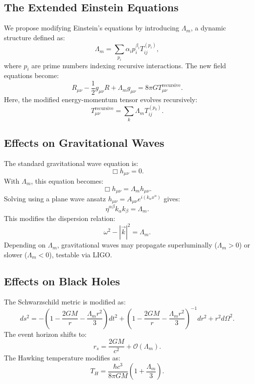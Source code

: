 \documentclass{article}
\theoremstyle{plain}
\begin{document}
\begin{itemize}
\begin{itemize}
\subsection{The Extended Einstein Equations}
We propose modifying Einstein’s equations by introducing $\Lambda_m$, a dynamic structure defined as:
\begin{equation}
    \Lambda_m = \sum_{p_i} \alpha_i p_i^{\beta_i} T_{ij}^{(p_i)},
\end{equation}
where $p_i$ are prime numbers indexing recursive interactions.
The new field equations become:
\begin{equation}
    R_{\mu\nu} - \frac{1}{2} g_{\mu\nu} R + \Lambda_m g_{\mu\nu} = 8\pi G T_{\mu\nu}^{\text{recursive}}.
\end{equation}
Here, the modified energy-momentum tensor evolves recursively:
\begin{equation}
    T_{\mu\nu}^{\text{recursive}} = \sum_{k} \Lambda_m T_{ij}^{(p_k)}.
\end{equation}

\subsection{Effects on Gravitational Waves}
The standard gravitational wave equation is:
\begin{equation}
    \Box h_{\mu\nu} = 0.
\end{equation}
With $\Lambda_m$, this equation becomes:
\begin{equation}
    \Box h_{\mu\nu} = \Lambda_m h_{\mu\nu}.
\end{equation}
Solving using a plane wave ansatz $h_{\mu\nu} = A_{\mu\nu} e^{i (k_\alpha x^\alpha)}$ gives:
\begin{equation}
    \eta^{\alpha\beta} k_\alpha k_\beta = \Lambda_m.
\end{equation}
This modifies the dispersion relation:
\begin{equation}
    \omega^2 - |\vec{k}|^2 = \Lambda_m.
\end{equation}
Depending on $\Lambda_m$, gravitational waves may propagate superluminally ($\Lambda_m > 0$) or slower ($\Lambda_m < 0$), testable via LIGO.

\subsection{Effects on Black Holes}
The Schwarzschild metric is modified as:
\begin{equation}
    ds^2 = -\left(1 - \frac{2GM}{r} - \frac{\Lambda_m r^2}{3} \right) dt^2 + \left(1 - \frac{2GM}{r} - \frac{\Lambda_m r^2}{3} \right)^{-1} dr^2 + r^2 d\Omega^2.
\end{equation}
The event horizon shifts to:
\begin{equation}
    r_s = \frac{2GM}{c^2} + \mathcal{O}(\Lambda_m).
\end{equation}
The Hawking temperature modifies as:
\begin{equation}
    T_H = \frac{\hbar c^3}{8\pi G M} \left(1 + \frac{\Lambda_m}{3} \right).
\end{equation}


\end{itemize}
\end{itemize}
\end{document}

